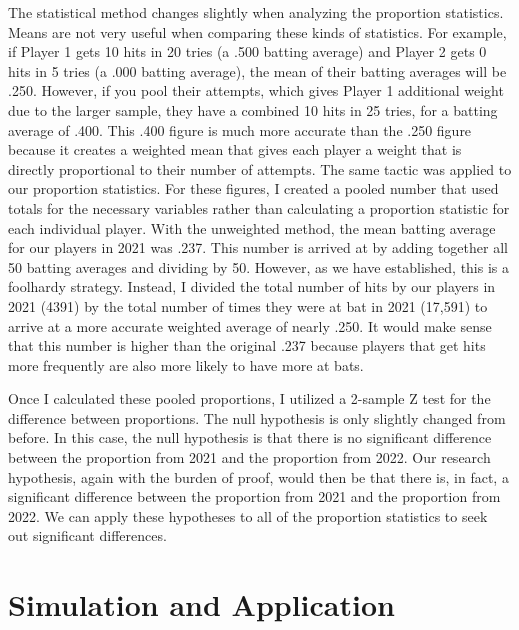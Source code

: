 \documentclass[10pt]{article}
\begin{document}
The statistical method changes slightly when analyzing the proportion statistics. Means are not very useful when comparing 
these kinds of statistics. For example, if Player 1 gets 10 hits in 20 tries (a .500 batting average) and Player 2 gets 0 hits 
in 5 tries (a .000 batting average), the mean of their batting averages will be .250. However, if you pool their attempts, 
which gives Player 1 additional weight due to the larger sample, they have a combined 10 hits in 25 tries, for a batting 
average of .400. This .400 figure is much more accurate than the .250 figure because it creates a weighted mean that gives 
each player a weight that is directly proportional to their number of attempts. The same tactic was applied to our proportion 
statistics. For these figures, I created a pooled number that used totals for the necessary variables rather than calculating 
a proportion statistic for each individual player. With the unweighted method, the mean batting average for our players in 2021 
was .237. This number is arrived at by adding together all 50 batting averages and dividing by 50. However, as we have 
established, this is a foolhardy strategy. Instead, I divided the total number of hits by our players in 2021 (4391) by the 
total number of times they were at bat in 2021 (17,591) to arrive at a more accurate weighted average of nearly .250. It would 
make sense that this number is higher than the original .237 because players that get hits more frequently are also more likely 
to have more at bats. 

Once I calculated these pooled proportions, I utilized a 2-sample Z test for the difference between proportions. The null 
hypothesis is only slightly changed from before. In this case, the null hypothesis is that there is no significant difference 
between the proportion from 2021 and the proportion from 2022. Our research hypothesis, again with the burden of proof, would 
then be that there is, in fact, a significant difference between the proportion from 2021 and the proportion from 2022. We can 
apply these hypotheses to all of the proportion statistics to seek out significant differences.

\section{Simulation and Application}
\end{document}
